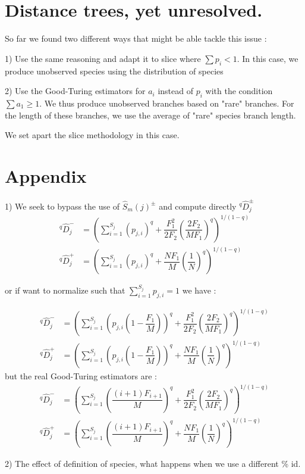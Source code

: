 \documentclass{article}
\begin{document}
\section{Distance trees, \textbf{yet unresolved}.}  

So far we found two different ways that might be able tackle this issue :

1) Use the same reasoning and adapt it to slice where $\sum p_i < 1$. In this case, we produce unobserved species using the distribution 
of species 

2) Use the Good-Turing estimators for $a_i$ instead of $p_i$ with the condition $\sum a_1 \geq 1$. We thus produce unobserved branches based on "rare" branches. For the length of these branches, we use the average of "rare" species branch length.

We set apart the slice methodology in this case.
\section{Appendix} 

1) We seek to bypass the use of $\widehat{S}_m(j)^{\pm}$ and compute directly $^q \widehat{D}_j^{\pm}$
\begin{align}
^q \widehat{D}_j^- & =\left( \sum_{i=1}^{S_j} (p_{j,i})^q +\dfrac{F_1^2}{2 F_2} \left(\dfrac{2 F_2}{M F_1}\right)^q \right)^{1/(1-q)} \\
^q \widehat{D}_j^+ & =\left( \sum_{i=1}^{S_j} (p_{j,i})^q +\dfrac{N F_1}{M} \left(\dfrac{1}{N}\right)^q \right)^{1/(1-q)}
\end{align}

or if want to normalize such that $\sum_{i=1}^{S_j}p_{j,i}=1$ we have :

\begin{align}
^q \widehat{D}_j^- & =\left( \sum_{i=1}^{S_j} \left(p_{j,i}\left(1-\dfrac{F_1}{M}\right)\right)^q +\dfrac{F_1^2}{2 F_2} \left(\dfrac{2 F_2}{M F_1}\right)^q \right)^{1/(1-q)} \\
^q \widehat{D}_j^+ & =\left( \sum_{i=1}^{S_j} \left(p_{j,i}\left(1-\dfrac{F_1}{M}\right)\right)^q +\dfrac{N F_1}{M} \left(\dfrac{1}{N}\right)^q \right)^{1/(1-q)}
\end{align}
 but the real Good-Turing estimators are :
\begin{align}
^q \widehat{D}_j^- & =\left( \sum_{i=1}^{S_j}  \left( \dfrac{(i+1) F_{i+1}}{M}\right)^q +\dfrac{F_1^2}{2 F_2} \left(\dfrac{2 F_2}{M F_1}\right)^q \right)^{1/(1-q)} \\
^q \widehat{D}_j^+ & =\left( \sum_{i=1}^{S_j} \left( \dfrac{(i+1) F_{i+1}}{M}\right)^q +\dfrac{N F_1}{M} \left(\dfrac{1}{N}\right)^q \right)^{1/(1-q)}
\end{align}

2) The effect of definition of species, what happens when we use a different \% id.




\end{document}
